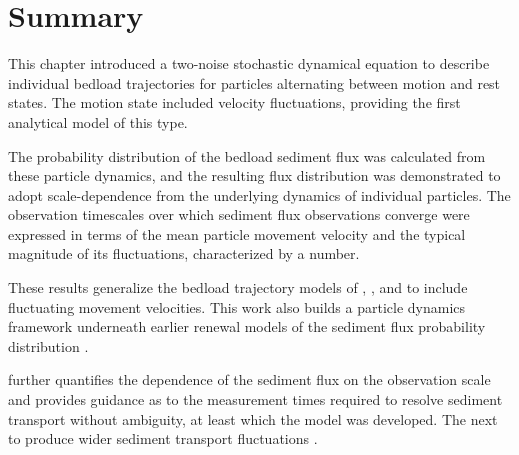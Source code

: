\section{Summary \label{sec:conc}} 
This chapter introduced a two-noise stochastic dynamical equation to describe individual bedload trajectories for particles alternating between motion and rest states. The motion state included velocity fluctuations, providing the first analytical model of this type.

The probability distribution of the bedload sediment flux was calculated from these particle dynamics, and the resulting flux distribution was demonstrated to adopt scale-dependence from the underlying dynamics of individual particles.
The observation timescales over which sediment flux observations converge were expressed in terms of the mean particle movement velocity and the typical magnitude of its fluctuations, characterized by a \DIFdelbegin {}\DIFdelend \DIFaddbegin {}\DIFaddend number.

These results generalize the bedload trajectory models of \citet{Einstein1937}, \citet{Lisle1998}, and \citet{Lajeunesse2017} to include fluctuating movement velocities. This work also builds a particle dynamics framework underneath earlier renewal models of the sediment flux probability distribution \citep{Lajeunesse2010,Ancey2020}.

\DIFdelbegin {}\DIFdelend \DIFaddbegin {}\DIFaddend further quantifies the dependence of the sediment flux on the observation scale and provides guidance as to the measurement times required to resolve sediment transport without ambiguity, at least \DIFdelbegin {}\DIFdelend \DIFaddbegin {}\DIFaddend which the model was developed.
The next \DIFdelbegin {}\DIFdelend \DIFaddbegin {}\DIFaddend to produce wider sediment transport fluctuations \DIFaddbegin {}\DIFaddend .

